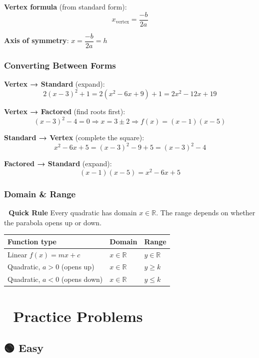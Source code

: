 \documentclass[
  letterpaper,
  DIV=11,
  numbers=noendperiod]{scrreprt}
\theoremstyle{definition}
\theoremstyle{remark}
\begin{document}
\textbf{Vertex formula} (from standard form):
\[x_{\text{vertex}} = \frac{-b}{2a}\]

\textbf{Axis of symmetry}: \(x = \dfrac{-b}{2a} = h\)

\subsubsection*{Converting Between
Forms}\label{converting-between-forms}

\textbf{Vertex → Standard} (expand):
\[2(x-3)^2 + 1 = 2(x^2-6x+9)+1 = 2x^2 - 12x + 19\]

\textbf{Vertex → Factored} (find roots first):
\[\textstyle(x-3)^2 - 4 = 0 \Rightarrow x = 3\pm2 \Rightarrow f(x)=(x-1)(x-5)\]

\textbf{Standard → Vertex} (complete the square):
\[x^2 - 6x + 5 = (x-3)^2 - 9 + 5 = (x-3)^2 - 4\]

\textbf{Factored → Standard} (expand): \[(x-1)(x-5) = x^2 - 6x + 5\]

\subsubsection*{Domain \& Range}\label{domain-range}

\textbf{🎯 Quick Rule} Every quadratic has domain \(x \in \mathbb{R}\).
The range depends on whether the parabola opens up or down.

\begin{longtable}[]{@{}lll@{}}
\toprule\noalign{}
Function type & Domain & Range \\
\midrule\noalign{}
\endhead
\bottomrule\noalign{}
\endlastfoot
Linear \(f(x) = mx+c\) & \(x \in \mathbb{R}\) & \(y \in \mathbb{R}\) \\
Quadratic, \(a > 0\) (opens up) & \(x \in \mathbb{R}\) & \(y \geq k\) \\
Quadratic, \(a < 0\) (opens down) & \(x \in \mathbb{R}\) &
\(y \leq k\) \\
\end{longtable}

\section{📝 Practice Problems}\label{practice-problems-4}

\subsection{🟢 Easy}
\end{document}
